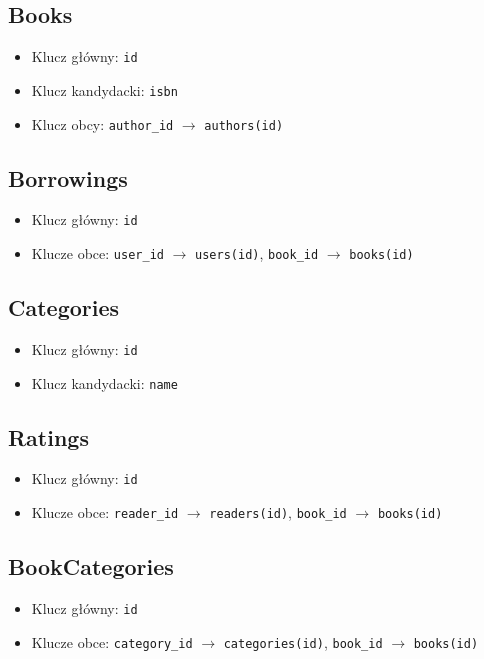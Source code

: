 \documentclass{article}
\begin{document}
\subsection*{Books}
\begin{itemize}
    \item Klucz główny: \texttt{id}
    \item Klucz kandydacki: \texttt{isbn}
    \item Klucz obcy: \texttt{author\_id} \(\rightarrow\) \texttt{authors(id)}
\end{itemize}

\subsection*{Borrowings}
\begin{itemize}
    \item Klucz główny: \texttt{id}
    \item Klucze obce: \texttt{user\_id} \(\rightarrow\) \texttt{users(id)}, \texttt{book\_id} \(\rightarrow\) \texttt{books(id)}
\end{itemize}

\subsection*{Categories}
\begin{itemize}
    \item Klucz główny: \texttt{id}
    \item Klucz kandydacki: \texttt{name}
\end{itemize}

\subsection*{Ratings}
\begin{itemize}
    \item Klucz główny: \texttt{id}
    \item Klucze obce: \texttt{reader\_id} \(\rightarrow\) \texttt{readers(id)}, \texttt{book\_id} \(\rightarrow\) \texttt{books(id)}
\end{itemize}

\subsection*{BookCategories}
\begin{itemize}
    \item Klucz główny: \texttt{id}
    \item Klucze obce: \texttt{category\_id} \(\rightarrow\) \texttt{categories(id)}, \texttt{book\_id} \(\rightarrow\) \texttt{books(id)}
\end{itemize}
\end{document}
